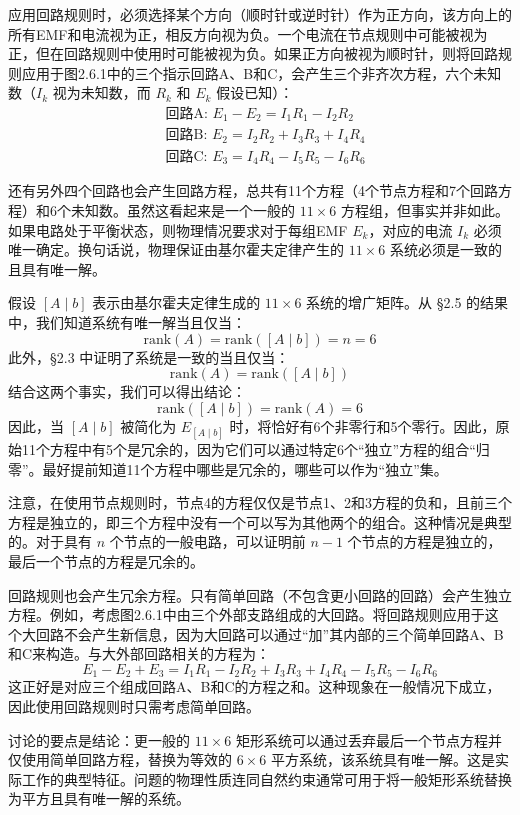 应用回路规则时，必须选择某个方向（顺时针或逆时针）作为正方向，该方向上的所有EMF和电流视为正，相反方向视为负。一个电流在节点规则中可能被视为正，但在回路规则中使用时可能被视为负。如果正方向被视为顺时针，则将回路规则应用于图2.6.1中的三个指示回路A、B和C，会产生三个非齐次方程，六个未知数（\(I_k\) 视为未知数，而 \(R_k\) 和 \(E_k\) 假设已知）：
\[
\begin{aligned}
&\text{回路A: } E_1 - E_2 = I_1 R_1 - I_2 R_2 \\
&\text{回路B: } E_2 = I_2 R_2 + I_3 R_3 + I_4 R_4 \\
&\text{回路C: } E_3 = I_4 R_4 - I_5 R_5 - I_6 R_6
\end{aligned}
\]

还有另外四个回路也会产生回路方程，总共有11个方程（4个节点方程和7个回路方程）和6个未知数。虽然这看起来是一个一般的 \(11 \times 6\) 方程组，但事实并非如此。如果电路处于平衡状态，则物理情况要求对于每组EMF \(E_k\)，对应的电流 \(I_k\) 必须唯一确定。换句话说，物理保证由基尔霍夫定律产生的 \(11 \times 6\) 系统必须是一致的且具有唯一解。

假设 \([A \mid b]\) 表示由基尔霍夫定律生成的 \(11 \times 6\) 系统的增广矩阵。从 §2.5 的结果中，我们知道系统有唯一解当且仅当：
\[
\text{rank}(A) = \text{rank}([A \mid b]) = n = 6
\]
此外，§2.3 中证明了系统是一致的当且仅当：
\[
\text{rank}(A) = \text{rank}([A \mid b])
\]
结合这两个事实，我们可以得出结论：
\[
\text{rank}([A \mid b]) = \text{rank}(A) = 6
\]
因此，当 \([A \mid b]\) 被简化为 \(E_{[A \mid b]}\) 时，将恰好有6个非零行和5个零行。因此，原始11个方程中有5个是冗余的，因为它们可以通过特定6个“独立”方程的组合“归零”。最好提前知道11个方程中哪些是冗余的，哪些可以作为“独立”集。

注意，在使用节点规则时，节点4的方程仅仅是节点1、2和3方程的负和，且前三个方程是独立的，即三个方程中没有一个可以写为其他两个的组合。这种情况是典型的。对于具有 \(n\) 个节点的一般电路，可以证明前 \(n-1\) 个节点的方程是独立的，最后一个节点的方程是冗余的。

回路规则也会产生冗余方程。只有简单回路（不包含更小回路的回路）会产生独立方程。例如，考虑图2.6.1中由三个外部支路组成的大回路。将回路规则应用于这个大回路不会产生新信息，因为大回路可以通过“加”其内部的三个简单回路A、B和C来构造。与大外部回路相关的方程为：
\[
E_1 - E_2 + E_3 = I_1 R_1 - I_2 R_2 + I_3 R_3 + I_4 R_4 - I_5 R_5 - I_6 R_6
\]
这正好是对应三个组成回路A、B和C的方程之和。这种现象在一般情况下成立，因此使用回路规则时只需考虑简单回路。

讨论的要点是结论：更一般的 \(11 \times 6\) 矩形系统可以通过丢弃最后一个节点方程并仅使用简单回路方程，替换为等效的 \(6 \times 6\) 平方系统，该系统具有唯一解。这是实际工作的典型特征。问题的物理性质连同自然约束通常可用于将一般矩形系统替换为平方且具有唯一解的系统。

